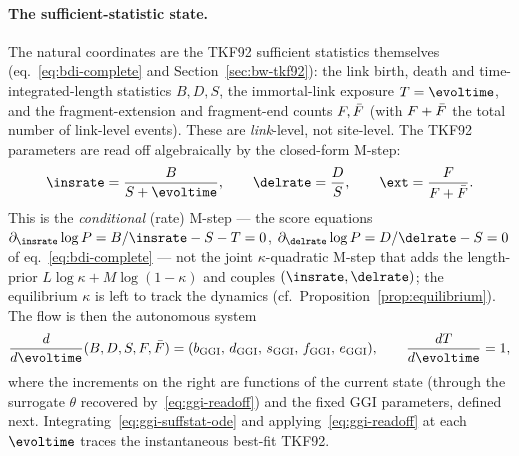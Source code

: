\paragraph{The sufficient-statistic state.}
The natural coordinates are the TKF92 sufficient statistics themselves
(eq.~\eqref{eq:bdi-complete} and Section~\ref{sec:bw-tkf92}): the link birth,
death and time-integrated-length statistics $B,D,S$, the immortal-link exposure
$T=\evoltime$, and the fragment-extension and fragment-end counts
$F,\bar F$ (with $F+\bar F$ the total number of
link-level events).  These are \emph{link}-level, not site-level.  The TKF92
parameters are read off algebraically by the closed-form M-step:
\begin{equation}
\label{eq:ggi-readoff}
\insrate=\frac{B}{S+\evoltime},\qquad
\delrate=\frac{D}{S},\qquad
\ext=\frac{\nfragext}{\nfragext+\nfragend}.
\end{equation}
This is the \emph{conditional} (rate) M-step --- the score equations
$\partial_\insrate\log P=B/\insrate-S-T=0$, $\partial_\delrate\log P=D/\delrate-S=0$
of eq.~\eqref{eq:bdi-complete} --- not the joint $\kappa$-quadratic M-step that
adds the length-prior $L\log\kappa+M\log(1-\kappa)$ and couples
$(\insrate,\delrate)$; the equilibrium $\kappa$ is left to track the dynamics
(cf.\ Proposition~\ref{prop:equilibrium}).
The flow is then the autonomous system
\begin{equation}
\label{eq:ggi-suffstat-ode}
\frac{d}{d\evoltime}(B,D,S,\nfragext,\nfragend)
  = (b_\ggi,\,d_\ggi,\,s_\ggi,\,f_\ggi,\,e_\ggi),
\qquad \frac{dT}{d\evoltime}=1,
\end{equation}
where the increments on the right are functions of the current state (through
the surrogate $\theta$ recovered by~\eqref{eq:ggi-readoff}) and the fixed GGI
parameters, defined next.  Integrating~\eqref{eq:ggi-suffstat-ode} and
applying~\eqref{eq:ggi-readoff} at each $\evoltime$ traces the instantaneous
best-fit TKF92.

